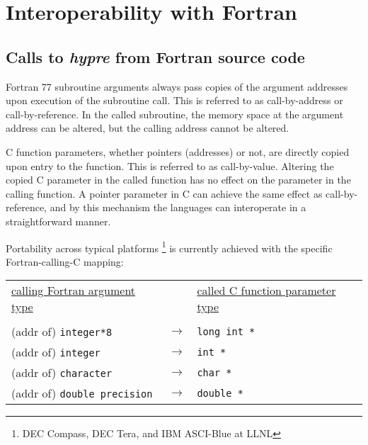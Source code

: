 \chapter{Interoperability with Fortran}

\section{Calls to {\slshape hypre} from Fortran source code}

Fortran 77 subroutine arguments always pass copies of the argument addresses
upon execution of the subroutine call.
This is referred to as call-by-address or call-by-reference.
In the called subroutine, the memory space at the
argument address can be altered, but the calling address cannot be
altered.

C function parameters, whether pointers (addresses) or not, are
directly copied upon
entry to the function. This is referred to as call-by-value.
Altering the copied C parameter in the
called function has no effect on the parameter in the calling function. 
A pointer parameter in C can achieve the same effect as call-by-reference,
and by this mechanism the languages can interoperate in a straightforward
manner.

Portability across typical platforms 
\footnote{DEC Compass, DEC Tera, and IBM ASCI-Blue at LLNL}
is currently achieved with the specific Fortran-calling-C mapping: 

\vspace{0.2in}

\begin{tabular}{lcl}

\underline{calling Fortran argument type} & &
\underline{called C function parameter type} \\
                              &                   &   \\
\hspace{0.1in} (addr of) \verb+integer*8+        & $\longrightarrow$ &
\hspace{0.5in} \verb+long int *+ \\
\hspace{0.1in} (addr of) \verb+integer+          & $\longrightarrow$ &
\hspace{0.5in} \verb+int *+ \\
\hspace{0.1in} (addr of) \verb+character+        & $\longrightarrow$ &
\hspace{0.5in} \verb+char *+ \\
\hspace{0.1in} (addr of) \verb+double precision+ & $\longrightarrow$ &
\hspace{0.5in} \verb+double *+ \\

\end{tabular}

